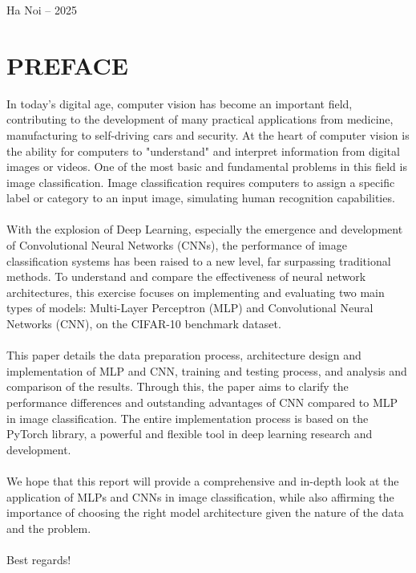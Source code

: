 \documentclass[12pt]{article}
\begin{document}
\begin{titlepage}
    \vfill %

    {\large Ha Noi – 2025} %

\end{titlepage}

\pagestyle{plain} %

\newpage
\section*{PREFACE}
In today's digital age, computer vision has become an important field, contributing to the development of many practical applications from medicine, manufacturing to self-driving cars and security. At the heart of computer vision is the ability for computers to "understand" and interpret information from digital images or videos. One of the most basic and fundamental problems in this field is image classification. Image classification requires computers to assign a specific label or category to an input image, simulating human recognition capabilities.
\\
\\
With the explosion of Deep Learning, especially the emergence and development of Convolutional Neural Networks (CNNs), the performance of image classification systems has been raised to a new level, far surpassing traditional methods. To understand and compare the effectiveness of neural network architectures, this exercise focuses on implementing and evaluating two main types of models: Multi-Layer Perceptron (MLP) and Convolutional Neural Networks (CNN), on the CIFAR-10 benchmark dataset.
\\
\\
This paper details the data preparation process, architecture design and implementation of MLP and CNN, training and testing process, and analysis and comparison of the results. Through this, the paper aims to clarify the performance differences and outstanding advantages of CNN compared to MLP in image classification. The entire implementation process is based on the PyTorch library, a powerful and flexible tool in deep learning research and development.
\\
\\
We hope that this report will provide a comprehensive and in-depth look at the application of MLPs and CNNs in image classification, while also affirming the importance of choosing the right model architecture given the nature of the data and the problem.
\\
\\
Best regards!
\end{document}
